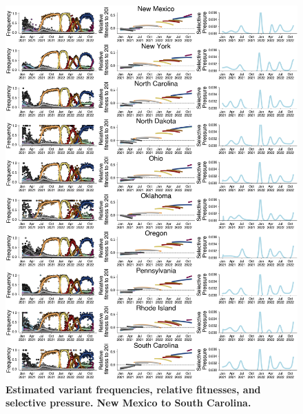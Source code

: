 \documentclass[11pt,oneside,letterpaper]{article}
\begin{document}
\begin{figure}[t!]
    \centering
    \includegraphics[width=1.0\textwidth=0.01]{./supplementary_figures/selective-pressure-analysis_group_4.png}
    \caption{
      \textbf{Estimated variant frequencies, relative fitnesses, and selective pressure. New Mexico to South Carolina.}
    }
    \label{fig:selective_pressure_group_4}
\end{figure}
\end{document}
